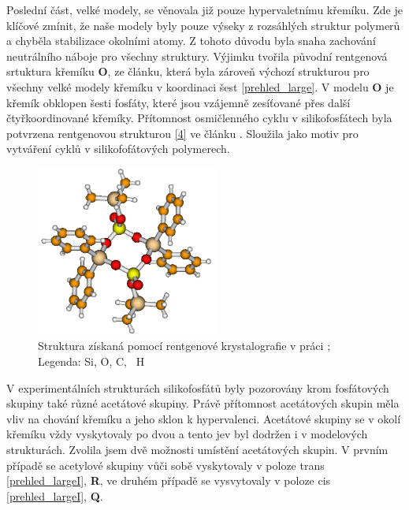 \documentclass[
digital, %
table,   %
lof,     %
lot,     %
oneside,
]{fithesis3}
\begin{document}
Poslední část, velké modely, se věnovala již pouze hypervaletnímu křemíku. Zde je klíčové zmínit, že naše modely byly pouze výseky z rozsáhlých struktur polymerů a chyběla stabilizace okolními atomy. Z tohoto důvodu byla snaha zachování neutrálního náboje pro všechny struktury. Výjimku tvořila původní rentgenová srtuktura křemíku \textbf{O}, ze článku\cite{C3NJ00721A},  která byla zároveň výchozí strukturou pro všechny velké modely křemíku v koordinaci šest \ref{prehled_large}.
V modelu \textbf{O} je křemík obklopen šesti fosfáty, které jsou vzájemně zesíťované přes další čtyřkoordinované křemíky. Přítomnost osmičlenného cyklu v silikofosfátech byla potvrzena rentgenovou strukturou \ref{4} ve článku \cite{rtg_4_pinkas}. Sloužila jako motiv pro vytváření cyklů v silikofofátových polymerech.
\begin{figure}
\begin{center}
\includegraphics[width=6cm]{rtg_4_kruh_samotne.png}
\caption{Struktura \ce{[(Ph2Si{O2P(O)OSiMe3})2]} získaná pomocí rentgenové krystalografie v práci \cite{rtg_4_pinkas};  Legenda:  Si,  O,  C, ~H}
\label{rtg_4}
\end{center}
\end{figure}
V experimentálních strukturách silikofosfátů byly pozorovány krom fosfátových skupiny také různé acetátové skupiny. Právě přítomnost acetátových skupin měla vliv na chování křemíku a jeho sklon k hypervalenci. Acetátové skupiny se  v okolí křemíku vždy vyskytovaly po dvou a tento jev byl dodržen i v modelových strukturách. Zvolila jsem dvě možnosti umístění acetátových skupin. V prvním případě se acetylové skupiny vůči sobě vyskytovaly v poloze trans \ref{prehled_largeI},  \textbf{R}, ve druhém případě se vysvytovaly v poloze cis \ref{prehled_largeI},  \textbf{Q}.
\end{document}
